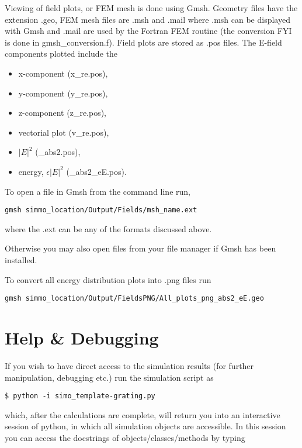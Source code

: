 \documentclass[11pt,a4paper,twoside]{report}
\begin{document}
Viewing of field plots, or FEM mesh is done using Gmsh. Geometry files have the extension .geo, FEM mesh files are .msh and .mail where .msh can be displayed with Gmsh and .mail are used by the Fortran FEM routine (the conversion FYI is done in gmsh\_conversion.f). Field plots are stored as .pos files. 
The E-field components plotted include the
\begin{itemize}
	\item x-component (x\_re.pos),
	\item y-component (y\_re.pos),
	\item z-component (z\_re.pos),
	\item vectorial plot (v\_re.pos),
	\item $|E|^2$ (\_abs2.pos),
	\item energy, $\epsilon|E|^2$ (\_abs2\_eE.pos).
\end{itemize}



To open a file in Gmsh from the command line run,

\begin{lstlisting}
gmsh simmo_location/Output/Fields/msh_name.ext
\end{lstlisting}

where the .ext can be any of the formats discussed above. 

Otherwise you may also open files from your file manager if Gmsh has been installed.


To convert all energy distribution plots into .png files run
\begin{lstlisting}
gmsh simmo_location/Output/FieldsPNG/All_plots_png_abs2_eE.geo
\end{lstlisting}



\section{Help \& Debugging}
If you wish to have direct access to the simulation results (for 
further manipulation, debugging etc.) run the simulation script as

\begin{lstlisting}
$ python -i simo_template-grating.py
\end{lstlisting}

which, after the calculations are complete, will return you into an interactive session 
of python, in which all simulation objects are accessible. In this session you can access
the docstrings of objects/classes/methods by typing
\end{document}
